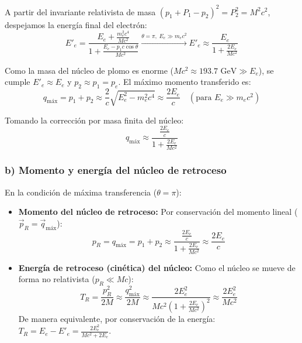 \begin{problema}
A partir del invariante relativista de masa $(p_1 + P_1 - p_2)^2 = P_2^2 = M^2 c^2$, despejamos la energía final del electrón:
\begin{equation*}
E'_e = \frac{E_e + \frac{m_e^2 c^4}{M c^2}}{1 + \frac{E_e - p_1 c \cos\theta}{M c^2}} \xrightarrow{\theta = \pi, \; E_e \gg m_e c^2} E'_e \approx \frac{E_e}{1 + \frac{2 E_e}{M c^2}}
\end{equation*}

Como la masa del núcleo de plomo es enorme ($M c^2 \approx 193.7\text{ GeV} \gg E_e$), se cumple $E'_e \approx E_e$ y $p_2 \approx p_1 = p_e$. El máximo momento transferido es:
\begin{equation*}
q_{\text{máx}} = p_1 + p_2 \approx \frac{2}{c}\sqrt{E_e^2 - m_e^2 c^4} \approx \frac{2 E_e}{c} \quad (\text{para } E_e \gg m_e c^2)
\end{equation*}

Tomando la corrección por masa finita del núcleo:
\begin{equation*}
q_{\text{máx}} \approx \frac{\frac{2 E_e}{c}}{1 + \frac{2 E_e}{M c^2}}
\end{equation*}

\subsubsection*{b) Momento y energía del núcleo de retroceso}

En la condición de máxima transferencia ($\theta = \pi$):
\begin{itemize}
    \item \textbf{Momento del núcleo de retroceso:} Por conservación del momento lineal ($\vec{p}_R = \vec{q}_{\text{máx}}$):
    \begin{equation*}
    p_R = q_{\text{máx}} = p_1 + p_2 \approx \frac{\frac{2 E_e}{c}}{1 + \frac{2 E_e}{M c^2}} \approx \frac{2 E_e}{c}
    \end{equation*}

    \item \textbf{Energía de retroceso (cinética) del núcleo:} Como el núcleo se mueve de forma no relativista ($p_R \ll M c$):
    \begin{equation*}
    T_R = \frac{p_R^2}{2 M} \approx \frac{q_{\text{máx}}^2}{2 M} \approx \frac{2 E_e^2}{M c^2 \left(1 + \frac{2 E_e}{M c^2}\right)^2} \approx \frac{2 E_e^2}{M c^2}
    \end{equation*}
    De manera equivalente, por conservación de la energía: $T_R = E_e - E'_e = \frac{2 E_e^2}{M c^2 + 2 E_e}$.
\end{itemize}


\end{problema}

